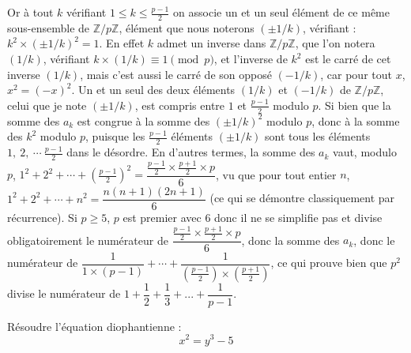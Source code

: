 \begin{sol}
Or à tout $k$ vérifiant $1 \leq k \leq \frac{p-1}{2} $ on associe un et un seul élément de ce même sous-ensemble de $\mathbb{Z}/p\mathbb{Z}$, élément que nous noterons $(\pm1/k)$, vérifiant : $k^2 \times (\pm1/k)^2 = 1$. En effet $k$ admet un inverse dans $\mathbb{Z}/p\mathbb{Z}$, que l'on notera $(1/k)$, vérifiant $k \times (1/k) \equiv 1 \pmod{p}$, et l'inverse de $k^2$ est le carré de cet inverse $(1/k)$, mais c'est aussi le carré de son opposé $(-1/k)$, car pour tout $x$, $x^2 = (-x)^2$. Un et un seul des deux éléments $(1/k)$ et $(-1/k)$ de $\mathbb{Z}/p\mathbb{Z}$, celui que je note $(\pm1/k)$, est compris entre $1$ et $\frac{p-1}{2}$ modulo $p$. Si bien que la somme des $a_k$ est congrue à la somme des $(\pm1/k)^2$ modulo $p$, donc à la somme des $k^2$ modulo $p$, puisque les $\frac{p-1}{2}$ éléments $(\pm1/k)$ sont tous les éléments $1, \ 2, \ \cdots \ \frac{p-1}{2}$ dans le désordre. En d'autres termes, la somme des $a_k$ vaut, modulo $p$, $1^2 + 2^2 + \cdots + \left(\frac{p-1}{2}\right)^2 = \dfrac{\frac{p-1}{2} \times \frac{p+1}{2} \times p}{6}$, vu que pour tout entier $n$, $1^2 + 2^2 + \cdots + n^2 = \dfrac{n(n+1)(2n+1)}{6}$ (ce qui se démontre classiquement par récurrence). Si $p \geq 5$, $p$ est premier avec $6$ donc il ne se simplifie pas et divise obligatoirement le numérateur de $\dfrac{\frac{p-1}{2} \times \frac{p+1}{2} \times p}{6}$, donc la somme des $a_k$, donc le numérateur de  $\dfrac1{1 \times (p-1)} + \cdots +  \dfrac1{\left(\frac{p-1}{2}\right) \times \left(\frac{p+1}{2}\right)}$, ce qui prouve bien que $p^2$ divise le numérateur de $1 + \dfrac12 + \dfrac13 + ... + \dfrac1{p-1}$.


\end{sol}

\bigskip


\begin{exo}

\medskip

Résoudre l'équation diophantienne :
$$ x^2 = y^3 - 5 $$

\end{exo}

\bigskip

